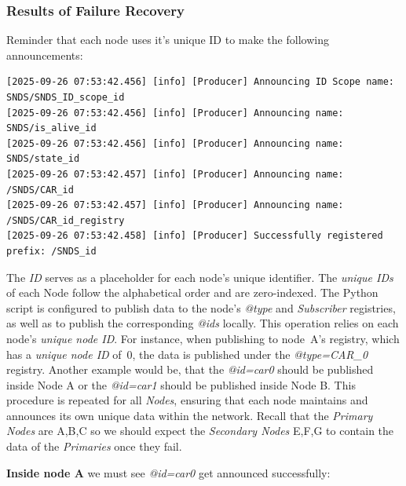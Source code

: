 \documentclass{article}
\begin{document}
\subsubsection{Results of Failure Recovery}

Reminder that each node uses it's unique ID to make the following announcements:
\begin{lstlisting}[language=log,caption={Local announcements for each Node},label={lst:announcements-for-node-a}]
[2025-09-26 07:53:42.456] [info] [Producer] Announcing ID Scope name: SNDS/SNDS_ID_scope_id
[2025-09-26 07:53:42.456] [info] [Producer] Announcing name: SNDS/is_alive_id
[2025-09-26 07:53:42.456] [info] [Producer] Announcing name: SNDS/state_id
[2025-09-26 07:53:42.457] [info] [Producer] Announcing name: /SNDS/CAR_id
[2025-09-26 07:53:42.457] [info] [Producer] Announcing name: /SNDS/CAR_id_registry
[2025-09-26 07:53:42.458] [info] [Producer] Successfully registered prefix: /SNDS_id  

\end{lstlisting}

The \textit{ID} serves as a placeholder for each node’s unique identifier. The \emph{unique IDs} of each Node follow the alphabetical order and are zero-indexed. The Python script is configured to publish data to the node’s \textit{@type} and \textit{Subscriber} registries, as well as to publish the corresponding \textit{@ids} locally. This operation relies on each node’s \emph{unique node ID}. For instance, when publishing to node~A’s registry, which has a \emph{unique node ID} of~0, the data is published under the \textit{@type=CAR\_0} registry. Another example would be, that the \textit{@id=car0} should be published inside Node A or the \textit{@id=car1} should be published inside Node B. This procedure is repeated for all \emph{Nodes}, ensuring that each node maintains and announces its own unique data within the network. Recall that the \emph{Primary Nodes} are A,B,C so we should expect the \emph{Secondary Nodes} E,F,G to contain the data of the \emph{Primaries} once they fail.


\textbf{Inside node A} we must see \textit{@id=car0} get announced successfully:
\end{document}
